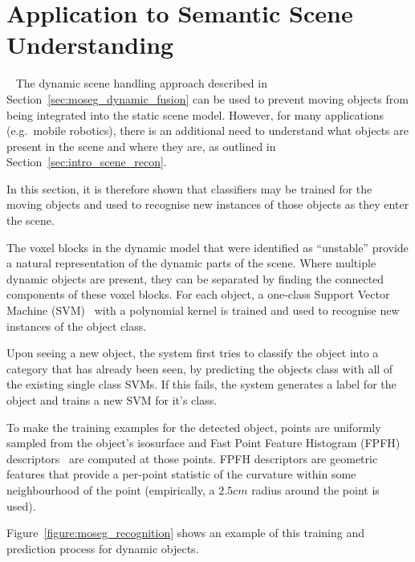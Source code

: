\section{Application to Semantic Scene Understanding}
~\label{sec:moseg_semantic}
The dynamic scene handling approach described in Section~\ref{sec:moseg_dynamic_fusion}
can be used to prevent moving objects from being integrated into the static
scene model. However, for many applications (e.g.\ mobile robotics), there is an
additional need to understand what objects are present in the scene and where
they are, as outlined in Section~\ref{sec:intro_scene_recon}.

In this section, it is therefore shown that classifiers may be trained for the
moving objects and used to recognise new instances of those objects as they
enter the scene.

The voxel blocks in the dynamic model that were identified as ``unstable''
provide a natural representation of the dynamic parts of the scene. Where
multiple dynamic objects are present, they can be separated by finding the
connected components of these voxel blocks. For each object, a one-class Support
Vector Machine (SVM)~\cite{Singer07} with a polynomial kernel is trained and used 
to recognise new instances of the object class.

Upon seeing a new object, the system first tries to classify the object into a category
that has already been seen, by predicting the objects class with all of the existing single class 
SVMs. If this fails, the system generates a label for the object and trains a new SVM for it's 
class. 

To make the training examples for the detected object, points are uniformly sampled from the object's
isosurface and Fast Point Feature Histogram (FPFH) descriptors~\cite{Rusu2009} are computed
at those points. FPFH descriptors are geometric features that provide a
per-point statistic of the curvature within some neighbourhood of the point
(empirically, a \(2.5cm\) radius around the point is used).

Figure~\ref{figure:moseg_recognition} shows an example of this training and
prediction process for dynamic objects.

